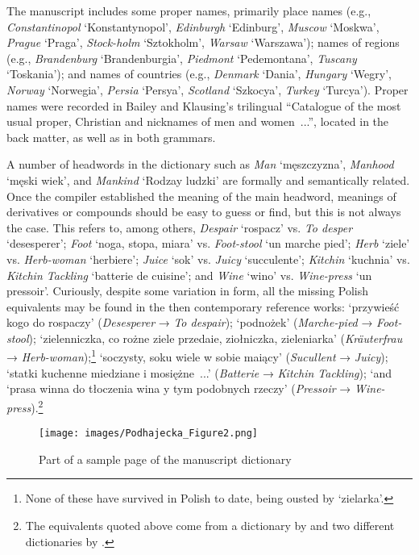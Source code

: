 \documentclass[output=paper,colorlinks,citecolor=brown,arabicfont,chinesefont]{langscibook}
\begin{document}
The manuscript includes some proper names, primarily place names (e.g., \emph{Constantinopol} ‘Konstantynopol’, \emph{Edinburgh} ‘Edinburg’, \emph{Muscow} ‘Moskwa’, \emph{Prague} ‘Praga’, \emph{Stock-holm} ‘Sztokholm’, \emph{Warsaw} ‘Warszawa’); names of regions (e.g., \emph{Brandenburg} ‘Brandenburgia’, \emph{Piedmont} ‘Pedemontana’, \emph{Tuscany} ‘Toskania’); and names of countries (e.g., \emph{Denmark} ‘Dania’, \emph{Hungary} ‘Wegry’, \emph{Norway} ‘Norwegia’, \emph{Persia} ‘Persya’, \emph{Scotland} ‘Szkocya’, \emph{Turkey} ‘Turcya’). Proper names were recorded in Bailey and Klausing’s trilingual “Catalogue of the most usual proper, Christian and nicknames of men and women~...”, located in the back matter, as well as in both grammars.

A number of headwords in the dictionary such as \emph{Man} ‘męszczyzna’, \emph{Manhood} ‘męski wiek’, and \emph{Mankind} ‘Rodzay ludzki’ are formally and semantically related. Once the compiler established the meaning of the main headword, meanings of derivatives or compounds should be easy to guess or find, but this is not always the case. This refers to, among others, \emph{Despair} ‘rospacz’ vs. \emph{To desper} ‘desesperer’; \emph{Foot} ‘noga, stopa, miara’ vs. \emph{Foot-stool} ‘un marche pied’; \emph{Herb} ‘ziele’ vs. \emph{Herb-woman} ‘herbiere’; \emph{Juice} ‘sok’ vs. \emph{Juicy} ‘succulente’; \emph{Kitchin} ‘kuchnia’ vs. \emph{Kitchin Tackling} ‘batterie de cuisine’; and \emph{Wine} ‘wino’ vs. \emph{Wine-press} ‘un pressoir’. Curiously, despite some variation in form, all the missing Polish equivalents may be found in the then contemporary reference works: ‘przywieść kogo do rospaczy’ (\emph{Desesperer} → \emph{To despair}); ‘podnożek’ (\emph{Marche-pied} → \emph{Foot-stool}); ‘zielenniczka, co rożne ziele przedaie, ziołniczka, zieleniarka’ (\emph{Kräuterfrau} → \emph{Herb-woman});\footnote{None of these have survived in Polish to date, being ousted by ‘zielarka’.} ‘soczysty, soku wiele w sobie maiący’ (\emph{Sucullent} → \emph{Juicy}); ‘statki kuchenne miedziane i mosiężne~...’ (\emph{Batterie} → \emph{Kitchin Tackling}); ‘and ‘prasa winna do tłoczenia wina y tym podobnych rzeczy’ (\emph{Pressoir} → \emph{Wine-press}).\footnote{The equivalents quoted above come from a dictionary by \citet{DanetKola1745} and two different dictionaries by \citet{Trotz_michel_a1764, Trotz_michel_a1772}.} 

\begin{figure}
\texttt{[image: images/Podhajecka\_Figure2.png]}
\caption{Part of a sample page of the manuscript dictionary}
\label{pod:fig2}
\end{figure}
\end{document}
